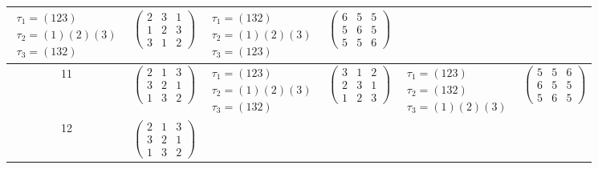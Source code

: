 \begin{longtable}{|c|p{2.7cm}|p{2.5cm}|p{2.7cm}|p{2.5cm}|p{2.7cm}|}
    $\begin{array}{l}\tau_1=(123)\\ \tau_2=(1)(2)(3)\\ \tau_3=(132)\end{array}$ &
    $\begin{pmatrix}2&3&1\\1&2&3\\3&1&2\end{pmatrix}$                           &
    $\begin{array}{l}\tau_1=(132)\\ \tau_2=(1)(2)(3)\\ \tau_3=(123)\end{array}$ &
    $\begin{pmatrix}6&5&5\\5&6&5\\5&5&6\end{pmatrix}$                                                                                                       \\
    \hline
    11                                                                          &
    $\begin{pmatrix}2&1&3\\3&2&1\\1&3&2\end{pmatrix}$                           &
    $\begin{array}{l}\tau_1=(123)\\ \tau_2=(1)(2)(3)\\ \tau_3=(132)\end{array}$ &
    $\begin{pmatrix}3&1&2\\2&3&1\\1&2&3\end{pmatrix}$                           &
    $\begin{array}{l}\tau_1=(123)\\ \tau_2=(132)\\ \tau_3=(1)(2)(3)\end{array}$ &
    $\begin{pmatrix}5&5&6\\6&5&5\\5&6&5\end{pmatrix}$                                                                                                       \\
    \hline
    12                                                                          &
    $\begin{pmatrix}2&1&3\\3&2&1\\1&3&2\end{pmatrix}$                           &

\end{longtable}
